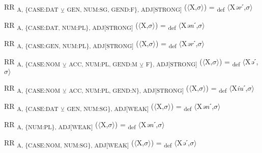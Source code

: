{\begin{exe}
 RR \textsubscript{A, \{CASE:DAT} \textsubscript{${\veebar}$}\textsubscript{ GEN, NUM:SG, GEND:F\}, ADJ[STRONG]} ($\langle$X,$\sigma $$\rangle$) = \textsubscript{def} $\langle$X\textit{ər}ˊ,$\sigma $$\rangle$
\end{exe}

\begin{exe}
 RR \textsubscript{A, \{CASE:DAT, NUM:PL\}, ADJ[STRONG]} ($\langle$X,$\sigma $$\rangle$) = \textsubscript{def} $\langle$X\textit{ən}ˊ,$\sigma $$\rangle$
\end{exe}

\begin{exe}
 RR \textsubscript{A, \{CASE:GEN, NUM:PL\}, ADJ[STRONG]} ($\langle$X,$\sigma $$\rangle$) = \textsubscript{def} $\langle$X\textit{ər}ˊ,$\sigma $$\rangle$
\end{exe}

\begin{exe}
 RR \textsubscript{A, \{CASE:NOM} \textsubscript{${\veebar}$}\textsubscript{ ACC, NUM:PL, GEND:M} \textsubscript{${\veebar}$}\textsubscript{ F\}, ADJ[STRONG]} ($\langle$X,$\sigma $$\rangle$) = \textsubscript{def} $\langle$X\textit{ə}ˊ,$\sigma $$\rangle$
\end{exe}

\begin{exe}
 RR \textsubscript{A, \{CASE:NOM} \textsubscript{${\veebar}$}\textsubscript{ ACC, NUM:PL, GEND:N\}, ADJ[STRONG]} ($\langle$X,$\sigma $$\rangle$) = \textsubscript{def} $\langle$X\textit{iu}ˊ,$\sigma $$\rangle$
\end{exe}

\begin{exe}
 RR \textsubscript{A, \{CASE:DAT} \textsubscript{${\veebar}$}\textsubscript{ GEN, NUM:SG\}, ADJ[WEAK]} ($\langle$X,$\sigma $$\rangle$) = \textsubscript{def} $\langle$X\textit{ən}ˊ,$\sigma $$\rangle$
\end{exe}

\begin{exe}
 RR \textsubscript{A, \{NUM:PL\}, ADJ[WEAK]} ($\langle$X,$\sigma $$\rangle$) = \textsubscript{def} $\langle$X\textit{ən}ˊ,$\sigma $$\rangle$
\end{exe}

\begin{exe}
 RR \textsubscript{A, \{CASE:NOM, NUM:SG\}, ADJ[WEAK]} ($\langle$X,$\sigma $$\rangle$) = \textsubscript{def} $\langle$X\textit{ə}ˊ,$\sigma $$\rangle$
\end{exe}

}
